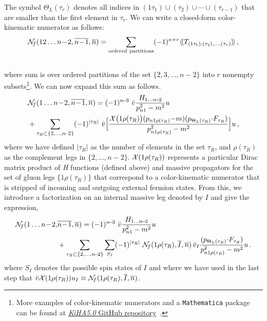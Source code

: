 \documentclass[a4paper,12pt]{article}
\makeatletter
\def\sc#1{\overline{#1}}
\def\nn{\nonumber}
\newcommand{\blue}{\color{blue}}
\newcommand{\npre}{\mathcal{N}}
\newcommand{\mdot}{{\cdot}}
\newcommand*{\bigcdot}{}%
\DeclareRobustCommand*{\bigcdot}{%
  \mathbin{\mathpalette\bigcdot@{}}%
}
\newcommand*{\bigcdot@scalefactor}{.6}
\newcommand*{\bigcdot@widthfactor}{1.25}
\newcommand*{\bigcdot@}[2]{%
  \sbox0{$#1\vcenter{}$}%
  \sbox2{$#1\cdot\m@th$}%
  \hbox to \bigcdot@widthfactor\wd2{%
    \hfil
    \raise\ht0\hbox{%
      \scalebox{\bigcdot@scalefactor}{%
        \lower\ht0\hbox{$#1\bullet\m@th$}%
      }%
    }%
    \hfil
  }%
}
\newcommand{\dd}{\bigcdot}
\makeatother
\begin{document}
The symbol $\Theta_L(\tau_{r})$ denotes all indices in $(1\tau_1)\cup (\tau_2)\cup\cdots \cup (\tau_{r-1})$ that are smaller than the first element in $\tau_{r}$. We can write a closed-form color-kinematic numerator as follows: \\[-15pt]
%
\begin{align}\label{eq:closedformFP}
    \npre_{\!f}(12\ldots n\!-\!2, \sc{n\!-\!1},\sc n)=\sum_{\rm ordered\  partitions}({-}1)^{n+r} \langle\!\langle T_{(1\tau_1),(\tau_2),\ldots,(\tau_r)}\rangle\!\rangle \,,
\end{align}\\[-15pt]
%
where sum is over ordered partitions of the set $\{2,3,...,n\!-\!2\}$ into $r$ nonempty subsets\footnote{More examples of color-kinematic numerators and a {\tt Mathematica} package can be found at  {\href{https://github.com/AmplitudeGravity/kinematicHopfAlgebra}{{\it \blue KiHA5.0} GitHub repository}}~\cite{ChenGitHub}.}. We can now expand this sum as follows.\\[-15pt] %
\begin{align}\label{eq:rec}
   &\npre_{\!f}(1\ldots n\!-\!2,\sc {n\!-\!1}, \sc n)=(-1)^{n\!-\!3} \ \bar v\dd { H_{1\ldots n\!-\!2}\over p^2_{n1}-m^2}\dd u\nn \\
   &+\sum_{\tau_R\subset \{2,\ldots,n\!-\!2\}} (-1)^{|\tau_R|} \ \bar v \dd \Big[ {{\cal X}\big(1\rho{(\tau_R)}\big)\dd (p_{n1\rho{(\tau_R)}}{-}m)\dd (p_{\Theta_L(\tau_R)}\mdot F_{\tau_R}) \over p^2_{n1\rho{(\tau_R)}}-m^2}\Big]\dd u \,,
\end{align}
%
where we have defined $|\tau_R|$ as the number of elements in the set $\tau_R$, and $\rho{(\tau_R)}$ as the complement legs in $\{2,\ldots, n\!-\!2\}$. ${\cal X}(1\rho{(\tau_R)})$ represents a particular Dirac matrix product of {\it H} functions (defined above) and massive propagators for the set of gluon legs $\{1\rho{(\tau_R)}\}$ that correspond to a color-kinematic numerator that is stripped of incoming and outgoing external fermion states. From this, we introduce a factorization on an internal massive leg denoted by $I$ and give the expression,\\[-15pt]
%
\begin{align}\label{eq:rec2}
  \npre_{\!f}(1\ldots n\!-\!2,&\sc {n\!-\!1}, \sc n) =(-1)^{n\!-\!3} \ \bar v\dd { H_{1\ldots n\!-\!2}\over p^2_{n1}-m^2}\dd u  \nn\\
   &+\sum_{\tau_R\subset \{2,\ldots,n\!-\!2\}} \sum_{S_{I}}(-1)^{|\tau_R|} \ \npre_{\!f}(1\rho{(\tau_R)},\sc I,\sc n)\,\bar v_I\dd {  (p_{\Theta_L(\tau_R)}\mdot F_{\tau_R}) \over p^2_{n1\rho{(\tau_R)}}-m^2} \dd u \, . \nn
\end{align}
%
where $S_{I}$ denotes the possible spin states of $I$ and where we have used in the last step that $\bar v\dd {\cal X}(1\rho{(\tau_R)})\dd u_I \equiv \npre_{\!f}(1\rho{(\tau_R)},\sc I,\sc n)$. 
\end{document}
